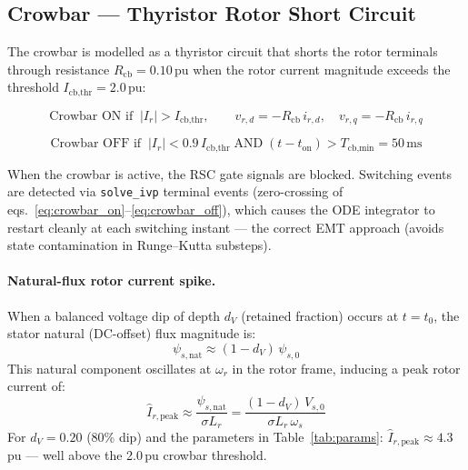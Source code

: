 \documentclass[11pt,a4paper]{article}
\begin{document}
\subsection{Crowbar — Thyristor Rotor Short Circuit}

The crowbar is modelled as a thyristor circuit that shorts the rotor
terminals through resistance $R_\text{cb} = 0.10$\,pu when the rotor
current magnitude exceeds the threshold $I_\text{cb,thr} = 2.0$\,pu:

\begin{equation}
  \text{Crowbar ON if}\;\; |I_r| > I_\text{cb,thr},
  \qquad
  v_{r,d} = -R_\text{cb}\,i_{r,d},\quad v_{r,q} = -R_\text{cb}\,i_{r,q}
  \label{eq:crowbar_on}
\end{equation}

\begin{equation}
  \text{Crowbar OFF if}\;\; |I_r| < 0.9\,I_\text{cb,thr}
  \;\text{AND}\; (t - t_\text{on}) > T_\text{cb,min} = 50\,\text{ms}
  \label{eq:crowbar_off}
\end{equation}

When the crowbar is active, the RSC gate signals are blocked.
Switching events are detected via \texttt{solve\_ivp} terminal events
(zero-crossing of eqs.~\eqref{eq:crowbar_on}–\eqref{eq:crowbar_off}),
which causes the ODE integrator to restart cleanly at each switching
instant — the correct EMT approach (avoids state contamination
in Runge–Kutta substeps).

\paragraph{Natural-flux rotor current spike.}
When a balanced voltage dip of depth $d_V$ (retained fraction) occurs
at $t = t_0$, the stator natural (DC-offset) flux magnitude is:
\begin{equation}
  \psi_{s,\text{nat}} \approx (1 - d_V)\,\psi_{s,0}
  \label{eq:nat_flux}
\end{equation}
This natural component oscillates at $\omega_r$ in the rotor frame,
inducing a peak rotor current of:
\begin{equation}
  \hat{I}_{r,\text{peak}} \approx \frac{\psi_{s,\text{nat}}}{\sigma L_r}
  = \frac{(1 - d_V)\,V_{s,0}}{\sigma L_r\,\omega_s}
  \label{eq:ir_peak}
\end{equation}
For $d_V = 0.20$ (80\% dip) and the parameters in Table~\ref{tab:params}:
$\hat{I}_{r,\text{peak}} \approx 4.3$\,pu — well above the 2.0\,pu
crowbar threshold.
\end{document}
